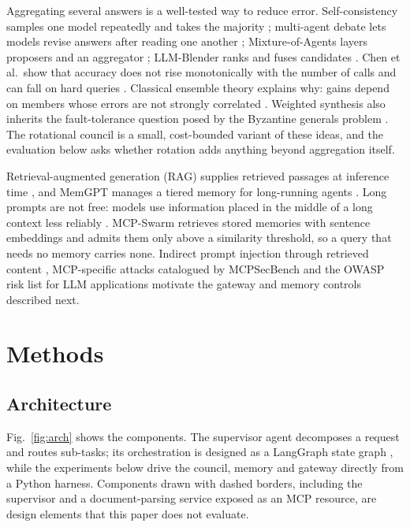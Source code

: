 Aggregating several answers is a well-tested way to reduce error. Self-consistency samples one model repeatedly and takes the majority \cite{wang2023selfconsistency}; multi-agent debate lets models revise answers after reading one another \cite{du2024debate}; Mixture-of-Agents layers proposers and an aggregator \cite{wang2024moa}; LLM-Blender ranks and fuses candidates \cite{jiang2023blender}. Chen et al.\ show that accuracy does not rise monotonically with the number of calls and can fall on hard queries \cite{chen2024calls}. Classical ensemble theory explains why: gains depend on members whose errors are not strongly correlated \cite{dietterich2000ensemble}. Weighted synthesis also inherits the fault-tolerance question posed by the Byzantine generals problem \cite{lamport1982byzantine}. The rotational council is a small, cost-bounded variant of these ideas, and the evaluation below asks whether rotation adds anything beyond aggregation itself.

Retrieval-augmented generation (RAG) supplies retrieved passages at inference time \cite{lewis2020rag}, and MemGPT manages a tiered memory for long-running agents \cite{packer2023memgpt}. Long prompts are not free: models use information placed in the middle of a long context less reliably \cite{liu2024lost}. MCP-Swarm retrieves stored memories with sentence embeddings \cite{reimers2019sbert} and admits them only above a similarity threshold, so a query that needs no memory carries none. Indirect prompt injection through retrieved content \cite{greshake2023injection}, MCP-specific attacks catalogued by MCPSecBench \cite{yang2025mcpsecbench} and the OWASP risk list for LLM applications \cite{owasp2025} motivate the gateway and memory controls described next.

\section{Methods}
\subsection{Architecture}
Fig.~\ref{fig:arch} shows the components. The supervisor agent decomposes a request and routes sub-tasks; its orchestration is designed as a LangGraph state graph \cite{langgraph}, while the experiments below drive the council, memory and gateway directly from a Python harness. Components drawn with dashed borders, including the supervisor and a document-parsing service exposed as an MCP resource, are design elements that this paper does not evaluate.

